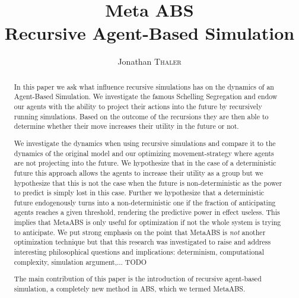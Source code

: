 \documentclass[a4paper, 10pt, conference]{IEEEtran}
\title{Meta ABS \\ Recursive Agent-Based Simulation} %
\author{Jonathan \textsc{Thaler}} %
\begin{document}
\maketitle %

\begin{abstract}
In this paper we ask what influence recursive simulations has on the dynamics of an Agent-Based Simulation. We investigate the famous Schelling Segregation and endow our agents with the ability to project their actions into the future by recursively running simulations. Based on the outcome of the recursions they are then able to determine whether their move increases their utility in the future or not.

We investigate the dynamics when using recursive simulations and compare it to the dynamics of the original model and our optimizing movement-strategy where agents are not projecting into the future. We hypothesize that in the case of a deterministic future this approach allows the agents to increase their utility as a group but we hypothesize that this is not the case when the future is non-deterministic as the power to predict is simply lost in this case.  Further we hypothesize that a deterministic future endogenously turns into a non-deterministic one if the fraction of anticipating agents reaches a given threshold, rendering the predictive power in effect useless. This implies that MetaABS is only useful for optimization if not the whole system is trying to anticipate. 
We put strong emphasis on the point that MetaABS is \textit{not} another optimization technique but that this research was investigated to raise and address interesting philosophical questions and implications: determinism, computational complexity, simulation argument,... TODO

The main contribution of this paper is the introduction of recursive agent-based simulation, a completely new method in ABS, which we termed MetaABS.
\end{abstract}













\end{document}
